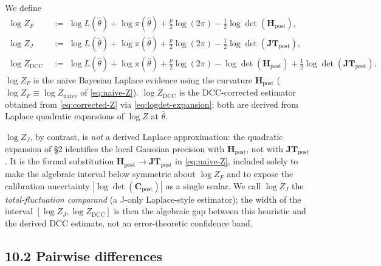 \documentclass[11pt]{article}
\begin{document}
We define
\begin{align}
\log Z_F
\;&:=\;
\log L(\hat\theta) + \log\pi(\hat\theta)
+ \tfrac{p}{2}\log(2\pi)
- \tfrac{1}{2}\log\det(\mathbf H_{\mathrm{post}}),
\label{eq:ZF-def}\\[4pt]
\log Z_J
\;&:=\;
\log L(\hat\theta) + \log\pi(\hat\theta)
+ \tfrac{p}{2}\log(2\pi)
- \tfrac{1}{2}\log\det(\mathbf{JT}_{\mathrm{post}}),
\label{eq:ZJ-def}\\[4pt]
\log Z_{\mathrm{DCC}}
\;&:=\;
\log L(\hat\theta) + \log\pi(\hat\theta)
+ \tfrac{p}{2}\log(2\pi)
- \log\det(\mathbf H_{\mathrm{post}})
+ \tfrac{1}{2}\log\det(\mathbf{JT}_{\mathrm{post}}).
\label{eq:ZDCC-def}
\end{align}
$\log Z_F$ is the naive Bayesian Laplace evidence using the curvature
$\mathbf H_{\mathrm{post}}$ ($\log Z_F \equiv \log Z_{\mathrm{naive}}$ of \eqref{eq:naive-Z}).
$\log Z_{\mathrm{DCC}}$ is the DCC-corrected estimator obtained from \eqref{eq:corrected-Z}
via \eqref{eq:logdet-expansion}; both are derived from Laplace quadratic expansions of
$\log Z$ at $\hat\theta$.

$\log Z_J$, by contrast, is \emph{not} a derived Laplace approximation: the quadratic
expansion of \S2 identifies the local Gaussian precision with $\mathbf H_{\mathrm{post}}$,
not with $\mathbf{JT}_{\mathrm{post}}$. It is the formal substitution
$\mathbf H_{\mathrm{post}} \to \mathbf{JT}_{\mathrm{post}}$ in \eqref{eq:naive-Z}, included
solely to make the algebraic interval below symmetric about $\log Z_F$ and to expose the
calibration uncertainty $|\log\det(\mathbf C_{\mathrm{post}})|$ as a single scalar. We
call $\log Z_J$ the \emph{total-fluctuation comparand} (a J-only Laplace-style estimator);
the width of the interval $[\log Z_J, \log Z_{\mathrm{DCC}}]$ is then the algebraic gap
between this heuristic and the derived DCC estimate, not an error-theoretic confidence
band.

\subsection*{10.2 Pairwise differences}
\end{document}
